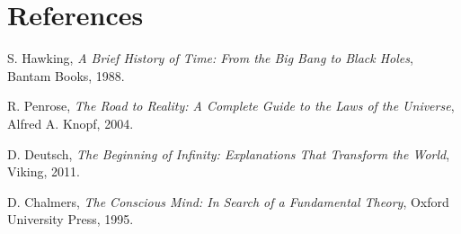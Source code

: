 \documentclass[twocolumn]{article}
\begin{document}
    \section*{References}
    \begin{thebibliography}{9}

        S. Hawking,
        \textit{A Brief History of Time: From the Big Bang to Black Holes},
        Bantam Books, 1988.

        R. Penrose,
        \textit{The Road to Reality: A Complete Guide to the Laws of the Universe},
        Alfred A. Knopf, 2004.

        D. Deutsch,
        \textit{The Beginning of Infinity: Explanations That Transform the World},
        Viking, 2011.

        D. Chalmers,
        \textit{The Conscious Mind: In Search of a Fundamental Theory},
        Oxford University Press, 1995.

    \end{thebibliography}
\end{document}
